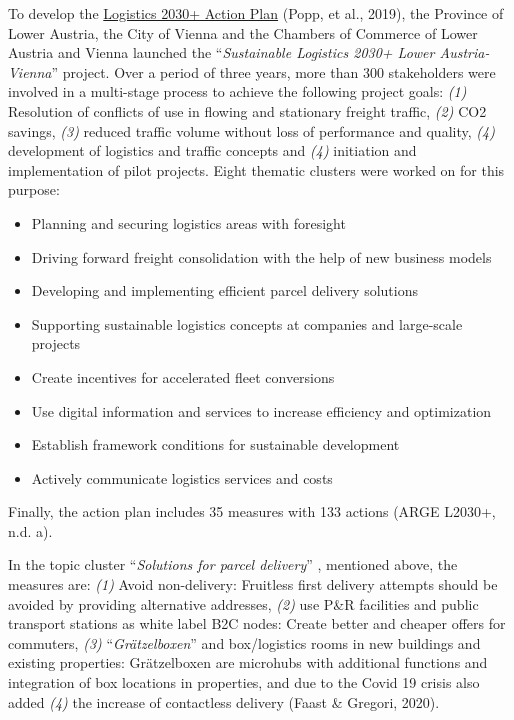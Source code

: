 \documentclass[
]{book}
\providecommand{\tightlist}{%
  \setlength{\itemsep}{0pt}\setlength{\parskip}{0pt}}
\begin{document}
To develop the \href{https://www.logistik2030.at/?page_id=2769}{Logistics 2030+ Action Plan} (Popp, et al., 2019), the Province of Lower Austria, the City of Vienna and the Chambers of Commerce of Lower Austria and Vienna launched the ``\emph{Sustainable Logistics 2030+ Lower Austria-Vienna}'' project. Over a period of three years, more than 300 stakeholders were involved in a multi-stage process to achieve the following project goals: \emph{(1)} Resolution of conflicts of use in flowing and stationary freight traffic, \emph{(2)} CO2 savings, \emph{(3)} reduced traffic volume without loss of performance and quality, \emph{(4)} development of logistics and traffic concepts and \emph{(4)} initiation and implementation of pilot projects. Eight thematic clusters were worked on for this purpose:

\begin{itemize}
\tightlist
\item
  Planning and securing logistics areas with foresight
\item
  Driving forward freight consolidation with the help of new business models
\item
  Developing and implementing efficient parcel delivery solutions
\item
  Supporting sustainable logistics concepts at companies and large-scale projects
\item
  Create incentives for accelerated fleet conversions
\item
  Use digital information and services to increase efficiency and optimization
\item
  Establish framework conditions for sustainable development
\item
  Actively communicate logistics services and costs
\end{itemize}

Finally, the action plan includes 35 measures with 133 actions (ARGE L2030+, n.d. a).

In the topic cluster ``\emph{Solutions for parcel delivery}'' , mentioned above, the measures are: \emph{(1)} Avoid non-delivery: Fruitless first delivery attempts should be avoided by providing alternative addresses, \emph{(2)} use P\&R facilities and public transport stations as white label B2C nodes: Create better and cheaper offers for commuters, \emph{(3)} ``\emph{Grätzelboxen}'' and box/logistics rooms in new buildings and existing properties: Grätzelboxen are microhubs with additional functions and integration of box locations in properties, and due to the Covid 19 crisis also added \emph{(4)} the increase of contactless delivery (Faast \& Gregori, 2020).
\end{document}
